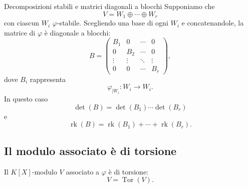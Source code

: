 \documentclass[a4paper]{article}
\begin{document}
\begin{radioactive}
\begin{snippetremark}{Decomposizioni stabili e matrici diagonali a blocchi}
    Supponiamo che
    \[
        V=W_1\oplus\cdots\oplus W_r
    \]
    con ciascun \(W_i\) \(\varphi\)-stabile.
    Scegliendo una base di ogni \(W_i\) e concatenandole, la matrice di \(\varphi\) è diagonale a blocchi:
    \[
        B=
        \begin{pmatrix}
            B_1 & 0 & \cdots & 0\\
            0 & B_2 & \cdots & 0\\
            \vdots & \vdots & \ddots & \vdots\\
            0 & 0 & \cdots & B_r
        \end{pmatrix},
    \]
    dove \(B_i\) rappresenta
    \[
        \varphi_{|W_i}\colon W_i\to W_i.
    \]
    In questo caso
    \[
        \det(B)=\det(B_1)\cdots\det(B_r)
    \]
    e
    \[
        \operatorname{rk}(B)
        =
        \operatorname{rk}(B_1)+\cdots+\operatorname{rk}(B_r).
    \]
\end{snippetremark}
\end{radioactive}

\subsection{Il modulo associato è di torsione}

\begin{radioactive}
\begin{snippetproposition}{}
    Il \(K[X]\)-modulo \(V\) associato a \(\varphi\) è di torsione:
    \[
        V=\operatorname{Tor}(V).
    \]
\end{snippetproposition}
\end{radioactive}
\end{document}
